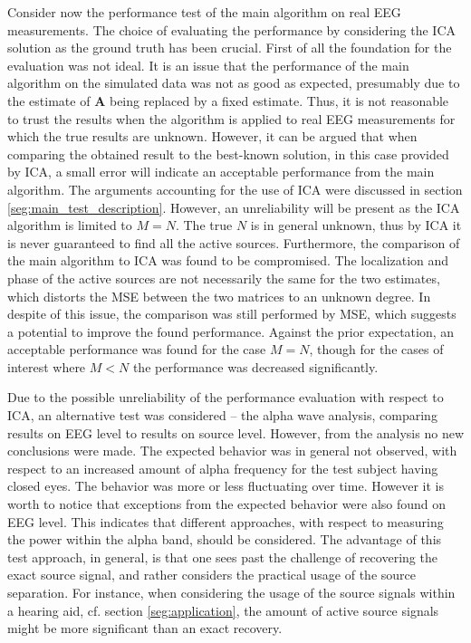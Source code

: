 Consider now the performance test of the main algorithm on real EEG measurements. 
The choice of evaluating the performance by considering the ICA solution as the ground truth has been crucial. 
First of all the foundation for the evaluation was not ideal. 
It is an issue that the performance of the main algorithm on the simulated data was not as good as expected, presumably due to the estimate of $\mathbf{A}$ being replaced by a fixed estimate. 
Thus, it is not reasonable to trust the results when the algorithm is applied to real EEG measurements for which the true results are unknown. 
However, it can be argued that when comparing the obtained result to the best-known solution, in this case provided by ICA, a small error will indicate an acceptable performance from the main algorithm. 
The arguments accounting for the use of ICA were discussed in section \ref{seg:main_test_description}. 
However, an unreliability will be present as the ICA algorithm is limited to $M = N$. 
The true $N$ is in general unknown, thus by ICA it is never guaranteed to find all the active sources.
Furthermore, the comparison of the main algorithm to ICA was found to be compromised. 
The localization and phase of the active sources are not necessarily the same for the two estimates, which distorts the MSE between the two matrices to an unknown degree.
In despite of this issue, the comparison was still performed by MSE, which suggests a potential to improve the found performance. 
Against the prior expectation, an acceptable performance was found for the case $M = N$, though for the cases of interest where $M < N$ the performance was decreased significantly.    

Due to the possible unreliability of the performance evaluation with respect to ICA, an alternative test was considered -- the alpha wave analysis, comparing results on EEG level to results on source level. 
However, from the analysis no new conclusions were made. The expected behavior was in general not observed, with respect to an increased amount of alpha frequency for the test subject having closed eyes.
The behavior was more or less fluctuating over time. However it is worth to notice that exceptions from the expected behavior were also found on EEG level. This indicates that different approaches, with respect to measuring the power within the alpha band, should be considered.
The advantage of this test approach, in general, is that one sees past the challenge of recovering the exact source signal, and rather considers the practical usage of the source separation. For instance, when considering the usage of the source signals within a hearing aid, cf. section \ref{seg:application}, the amount of active source signals might be more significant than an exact recovery.         

